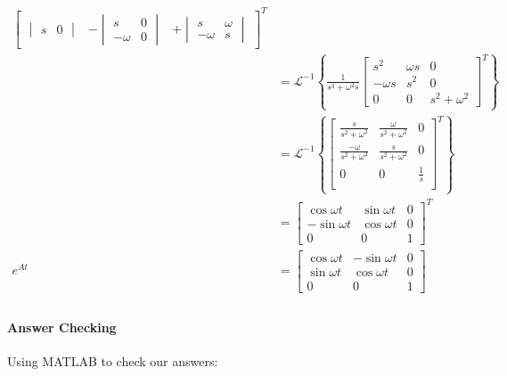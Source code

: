 \documentclass[11pt]{article}
\newcommand{\Lwrap}[1]{\left\{#1\right\}}
\newcommand{\Lagri}[1]{\mathcal{L}^{-1}\Lwrap{#1}}
\begin{document}
\begin{align*}
{\begin{bmatrix}
\begin{vmatrix}
        s      & 0
        \end{vmatrix}
        &
        -
        \begin{vmatrix}
        s       & 0 \\
        -\omega & 0
        \end{vmatrix}
        &
        +
        \begin{vmatrix}
        s       & \omega \\
        -\omega & s
        \end{vmatrix}
    \end{bmatrix}^T
}\\
&=
\Lagri{
    \frac{1}{s^3 + \omega^2 s}
    \begin{bmatrix}
        s^2       & \omega s & 0 \\
        -\omega s & s^2      & 0 \\
        0         & 0        & s^2 + \omega^2
    \end{bmatrix}^T
}\\
&=
\Lagri{
    \begin{bmatrix}
        \frac{s}{s^2 + \omega^2} &
        \frac{\omega}{s^2 + \omega^2} &
        0 \\
        \frac{-\omega}{s^2 + \omega^2} &
        \frac{s}{s^2 + \omega^2} &
        0 \\
        0 &
        0 &
        \frac{1}{s} \\
    \end{bmatrix}^T
}\\
&=
\begin{bmatrix}
\cos{\omega t}  & \sin{\omega t} & 0 \\
-\sin{\omega t} & \cos{\omega t} & 0 \\
0               & 0              & 1
\end{bmatrix}^T \\
e^{At}
&=
\begin{bmatrix}
\cos{\omega t} & -\sin{\omega t} & 0 \\
\sin{\omega t} & \cos{\omega t}  & 0 \\
0              & 0               & 1
\end{bmatrix} \\
\end{align*}
\paragraph{Answer Checking}
\label{sec:org16d91f6}
Using MATLAB to check our answers:
\end{document}
